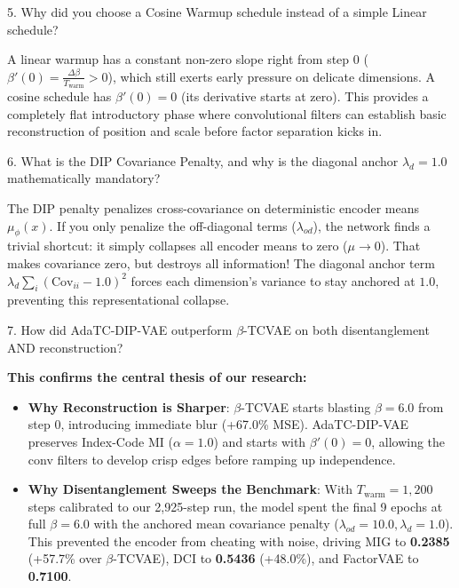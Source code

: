 \documentclass[11pt,a4paper]{article}
\begin{document}
\begin{questionbox}{5. Why did you choose a Cosine Warmup schedule instead of a simple Linear schedule?}
\begin{answerbox}
A linear warmup has a constant non-zero slope right from step 0 ($\beta'(0) = \frac{\Delta \beta}{T_{\mathrm{warm}}} > 0$), which still exerts early pressure on delicate dimensions. A cosine schedule has $\beta'(0) = 0$ (its derivative starts at zero). This provides a completely flat introductory phase where convolutional filters can establish basic reconstruction of position and scale before factor separation kicks in.
\end{answerbox}
\end{questionbox}

\begin{questionbox}{6. What is the DIP Covariance Penalty, and why is the diagonal anchor $\lambda_d=1.0$ mathematically mandatory?}
\begin{answerbox}
The DIP penalty penalizes cross-covariance on deterministic encoder means $\mu_\phi(x)$. If you only penalize the off-diagonal terms ($\lambda_{od}$), the network finds a trivial shortcut: it simply collapses all encoder means to zero ($\mu \to 0$). That makes covariance zero, but destroys all information! The diagonal anchor term $\lambda_d \sum_i (\mathrm{Cov}_{ii} - 1.0)^2$ forces each dimension's variance to stay anchored at $1.0$, preventing this representational collapse.
\end{answerbox}
\end{questionbox}

\begin{questionbox}{7. How did AdaTC-DIP-VAE outperform $\beta$-TCVAE on both disentanglement AND reconstruction?}
\begin{answerbox}
\textbf{This confirms the central thesis of our research:}
\begin{itemize}[noitemsep]
    \item \textbf{Why Reconstruction is Sharper}: $\beta$-TCVAE starts blasting $\beta=6.0$ from step 0, introducing immediate blur (+67.0\% MSE). AdaTC-DIP-VAE preserves Index-Code MI ($\alpha=1.0$) and starts with $\beta'(0)=0$, allowing the conv filters to develop crisp edges before ramping up independence.
    \item \textbf{Why Disentanglement Sweeps the Benchmark}: With $T_{\text{warm}} = 1,200$ steps calibrated to our 2,925-step run, the model spent the final 9 epochs at full $\beta=6.0$ with the anchored mean covariance penalty ($\lambda_{od}=10.0, \lambda_d=1.0$). This prevented the encoder from cheating with noise, driving MIG to \textbf{0.2385} (+57.7\% over $\beta$-TCVAE), DCI to \textbf{0.5436} (+48.0\%), and FactorVAE to \textbf{0.7100}.
\end{itemize}
\end{answerbox}
\end{questionbox}
\end{document}
